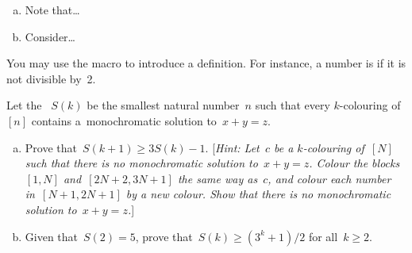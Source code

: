\begin{answer}
\begin{enumerate}[(a)]
\item
  Note that\ldots
\item
  Consider\ldots
\end{enumerate}
\end{answer}

You may use the macro  to introduce a definition. 
For instance, a number is  if it is not divisible by~2.

\begin{question}
Let the~ $S(k)$ be the smallest natural number~$n$
such that every $k$-colouring of~$[n]$ contains
a~monochromatic solution to~$x+y=z$.
\begin{enumerate}[(a)]
\item Prove that~$S(k+1)\geq 3S(k) -1$.
      [\emph{Hint: Let~$c$ be a $k$-colouring of~$[N]$ such that
      there is no monochromatic solution to~$x+y=z$. Colour the blocks~$[1,N]$
      and~$[2N+2,3N+1]$ the same way as~$c$,
      and colour each number in~$[N+1,2N+1]$ by a new colour.
      Show that there is no monochromatic solution to~$x+y=z$.}]
\item Given that~$S(2)=5$, prove that~$S(k)\geq (3^k+1)/2$ for all~$k\geq 2$.
\end{enumerate}
\end{question}


